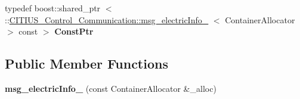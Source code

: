 \begin{DoxyCompactItemize}
\item 
\hypertarget{struct_c_i_t_i_u_s___control___communication_1_1msg__electric_info___a508f4f454657ba06b9331406955e8ac1}{typedef boost\-::shared\-\_\-ptr\*
$<$ \-::\hyperlink{struct_c_i_t_i_u_s___control___communication_1_1msg__electric_info__}{\-C\-I\-T\-I\-U\-S\-\_\-\-Control\-\_\-\-Communication\-::msg\-\_\-electric\-Info\-\_\-}\*
$<$ \-Container\-Allocator $>$ const  $>$ {\bfseries \-Const\-Ptr}}\label{struct_c_i_t_i_u_s___control___communication_1_1msg__electric_info___a508f4f454657ba06b9331406955e8ac1}

\end{DoxyCompactItemize}
\subsection*{\-Public \-Member \-Functions}
\begin{DoxyCompactItemize}
\item 
\hypertarget{struct_c_i_t_i_u_s___control___communication_1_1msg__electric_info___a705ac32c16e3a479d6220a0c06c5f7c1}{{\bfseries msg\-\_\-electric\-Info\-\_\-} (const \-Container\-Allocator \&\-\_\-alloc)}\label{struct_c_i_t_i_u_s___control___communication_1_1msg__electric_info___a705ac32c16e3a479d6220a0c06c5f7c1}

\end{DoxyCompactItemize}
